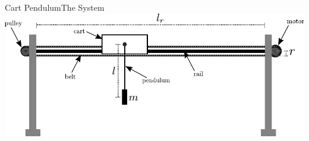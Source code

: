 %


\begin{frame}{Cart Pendulum}{The System}
  \includegraphics[width=1\textwidth]{figures/systemSetup}
\end{frame}


